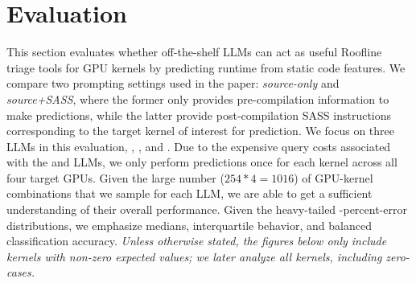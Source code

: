 


\section{Evaluation}
\label{sec:evaluation}

This section evaluates whether off-the-shelf LLMs can act as useful Roofline triage tools for GPU kernels by predicting runtime \rai from static code features.
We compare two prompting settings used in the paper: \textit{source-only} and \textit{source+SASS}, where the former only provides pre-compilation information to make predictions, while the latter provide post-compilation SASS instructions corresponding to the target kernel of interest for prediction.
We focus on three LLMs in this evaluation, \gptfivefour, \gptoss, and \opus.
Due to the expensive query costs associated with the \gptfivefour and \opus LLMs, we only perform \rai predictions once for each kernel across all four target GPUs.
Given the large number ($254*4=1016$) of GPU-kernel combinations that we sample for each LLM, we are able to get a sufficient understanding of their overall performance.
Given the heavy-tailed \rai-percent-error distributions, we emphasize medians, interquartile behavior, and balanced classification accuracy.
\textit{Unless otherwise stated, the figures below only include kernels with non-zero expected \rai values; we later analyze all kernels, including zero-\rai cases.}




